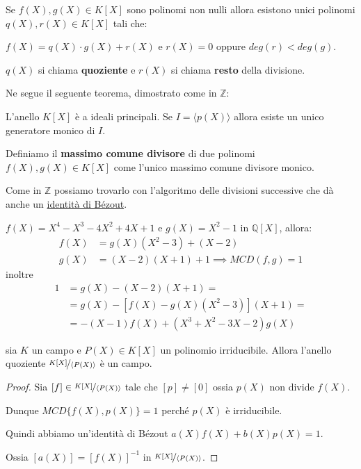 \documentclass[../main.tex]{subfiles}
\begin{document}
Se $f(X), g(X) \in K[X]$ sono polinomi non nulli allora esistono unici polinomi $q(X), r(X) \in K[X]$ tali che:

$f(X) = q(X) \cdot g(X) + r(X)$ e $r(X) = 0$ oppure $deg(r) < deg(g)$.

$q(X)$ si chiama \textbf{quoziente} e $r(X)$ si chiama \textbf{resto} della divisione.

Ne segue il seguente teorema, dimostrato come in $\mathbb{Z}$:
\begin{theorem}
    L'anello $K[X]$ è a ideali principali. Se $I = \langle p(X)\rangle$ allora esiste un unico generatore monico di $I$.
\end{theorem}

\begin{definition}
    Definiamo il \textbf{massimo comune divisore} di due polinomi $f(X), g(X) \in K[X]$ come l'unico massimo comune divisore monico.
\end{definition}

Come in $\mathbb{Z}$ possiamo trovarlo con l'algoritmo delle divisioni successive che dà anche un \underline{identità di Bézout}.

\begin{example}
    $f(X) = X^4 - X^3 -4X^2 + 4X + 1$ e $g(X) = X^2 - 1$ in $\mathbb{Q}[X]$, allora:
    \begin{align*}
        f(X) & = g(X)(X^2 - 3) + (X - 2)                 \\
        g(X) & = (X - 2)(X + 1) +1 \implies MCD(f,g) = 1
    \end{align*}
    inoltre
    \begin{align*}
        1 & = g(X) - (X - 2)(X + 1) =                \\
          & = g(X) - [f(X) - g(X)(X^2 - 3)](X + 1) = \\
          & = -(X - 1)f(X) + (X^3 + X^2 - 3X -2)g(X)
    \end{align*}
\end{example}

\begin{proposition} sia $K$ un campo e $P(X) \in K[X]$ un polinomio irriducibile. Allora l'anello quoziente $\nicefrac{K[X]}{\langle P(X)\rangle}$ è un campo.
\end{proposition}
\begin{proof}
    Sia $[f] \in \nicefrac{K[X]}{\langle P(X)\rangle}$ tale che $[p] \neq [0]$ ossia $p(X)$ non divide $f(X)$.

    Dunque $MCD\{f(X),p(X)\} = 1$ perché $p(X)$ è irriducibile.

    Quindi abbiamo un'identità di Bézout $a(X)f(X) + b(X)p(X) = 1$.

    Ossia $[a(X)] = [f(X)]^{-1}$ in $\nicefrac{K[X]}{\langle P(X)\rangle}$.
\end{proof}
\end{document}

